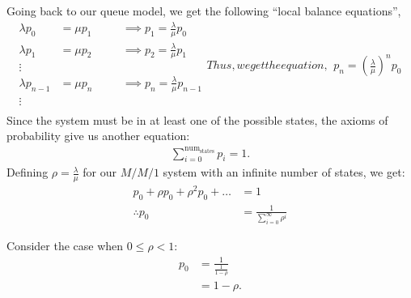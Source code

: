 \documentclass[11pt, a4paper]{report}
\begin{document}
Going back to our queue model, we get the following ``local balance equations'',
\begin{subequations}
    \begin{align}
        \lambda p_0 &= \mu p_1 &&\quad \implies p_1 = \frac{\lambda}{\mu} p_0 \\ 
        \lambda p_1 &= \mu p_2 &&\quad \implies p_2 = \frac{\lambda}{\mu} p_1 \\
        \vdots \\
        \lambda p_{n-1} &= \mu p_n &&\quad \implies p_n = \frac{\lambda}{\mu} p_{n-1} \\
        \vdots \\
    \end{align}
    Thus, we get the equation,
    \begin{align}
        p_n = \left(\frac{\lambda}{\mu}\right)^n p_0
    \end{align}
    \label{eq:lclBal}
\end{subequations}
Since the system must be in at least one of the possible states, the axioms of probability give us another equation:
\begin{align}
    \sum_{i=0}^{\text{num}_{\text{states}}} p_i = 1.
\end{align}
Defining $\rho = \frac{\lambda}{\mu}$ for our $M/M/1$ system with an infinite number of states, we get:
\begin{align}
    p_0 + \rho p_0 + \rho^2 p_0 + \ldots &= 1 \\
    \therefore p_0 &= \frac{1}{\sum_{i=0}^{\infty} \rho^i}
\end{align}

Consider the case when $0 \leq \rho < 1$:
\begin{align}
    p_0 &= \frac{1}{\frac{1}{1 - \rho}} \\
    &= 1 - \rho.
\end{align}


\end{document}
